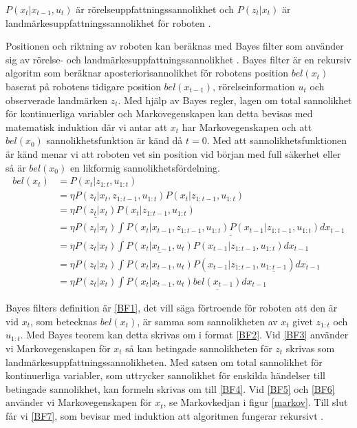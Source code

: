 $P(x_t|x_{t-1}, u_{t})$ är rörelseuppfattningssannolikhet och $P(z_t|x_t)$ är landmärkesuppfattningssannolikhet för roboten \citep{ProbabilisticRobotics}. 

Positionen och riktning av roboten kan beräknas med Bayes filter som använder sig av rörelse- och landmärkesuppfattningssannolikhet \citep{ProbabilisticRobotics}. Bayes filter är en rekursiv algoritm som beräknar aposteriorisannolikhet för robotens position $bel(x_t)$ baserat på robotens tidigare position $bel(x_{t-1})$, rörelseinformation $u_t$ och observerade landmärken $z_t$. Med hjälp av Bayes regler, lagen om total sannolikhet för kontinuerliga variabler och Markovegenskapen kan detta bevisas med matematisk induktion där vi antar att $x_t$ har Markovegenskapen och att $bel(x_0)$ sannolikhetsfunktion är känd då $t = 0$. Med att sannolikhetsfunktionen är känd menar vi att roboten vet sin position vid början med full säkerhet eller så är $bel(x_0)$ en likformig sannolikhetsfördelning.
\begin{align}
bel(x_t) & = P(x_t | z_{1:t}, u_{1:t}) \tag{BF1}\label{BF1} \\
        & = \eta P(z_t | x_t, z_{1:t-1}, u_{1:t}) P(x_t | z_{1:t-1}, u_{1:t}) \tag{BF2}\label{BF2}\\
        & = \eta \underline{P(z_t | x_t)} P(x_t | z_{1:t-1}, u_{1:t}) \tag{BF3}\label{BF3}\\
        & = \eta P(z_t | x_t) \underline{\int P(x_t | x_{t-1}, z_{1:t-1}, u_{1:t}) P(x_{t-1} | z_{1:t-1}, u_{1:t}) dx_{t-1}} \tag{BF4}\label{BF4}\\
        & = \eta P(z_t | x_t) \int \underline{P(x_t | x_{t-1}, u_t)} P(x_{t-1} | z_{1:t-1}, u_{1:t}) dx_{t-1} \tag{BF5}\label{BF5}\\
        & = \eta P(z_t | x_t) \int P(x_t | x_{t-1}, u_t) P(x_{t-1} | z_{1:t-1}, \underline{u_{1:t-1}}) dx_{t-1} \tag{BF6}\label{BF6}\\
        & = \eta P(z_t | x_t) \int P(x_t | x_{t-1}, u_t) \underline{bel(x_{t-1})} dx_{t-1} \tag{BF7}\label{BF7}
\end{align}

Bayes filters definition är \ref{BF1}, det vill säga förtroende för roboten att den är vid $x_t$, som betecknas $bel(x_t)$, är samma som sannolikheten av $x_t$ givet $z_{1:t}$ och $u_{1:t}$. Med Bayes teorem kan detta skrivas om i format \ref{BF2}. Vid \ref{BF3} använder vi Markovegenskapen för $x_t$ så kan betingade sannolikheten för $z_t$ skrivas som landmärkesuppfattningssannolikheten. Med satsen om total sannolikhet för kontinuerliga variabler, som uttrycker sannolikhet för enskilda händelser till betingade sannolikhet, kan formeln skrivas om till \ref{BF4}. Vid \ref{BF5} och \ref{BF6} använder vi Markovegenskapen för $x_t$, se Markovkedjan i figur \ref{markov}. Till slut får vi \ref{BF7}, som bevisar med induktion att algoritmen fungerar rekursivt \citep{ProbabilisticRobotics}.


